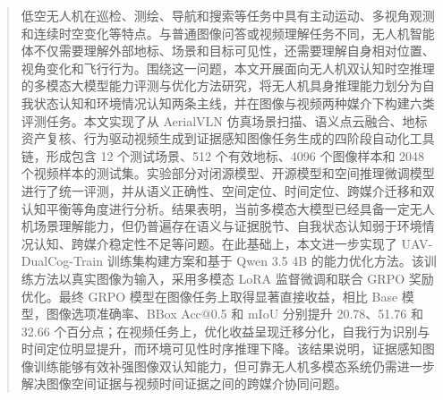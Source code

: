 
\begin{abstract}
    低空无人机在巡检、测绘、导航和搜索等任务中具有主动运动、多视角观测和连续时空变化等特点。与普通图像问答或视频理解任务不同，无人机智能体不仅需要理解外部地标、场景和目标可见性，还需要理解自身相对位置、视角变化和飞行行为。围绕这一问题，本文开展面向无人机双认知时空推理的多模态大模型能力评测与优化方法研究，将无人机具身推理能力划分为自我状态认知和环境情况认知两条主线，并在图像与视频两种媒介下构建六类评测任务。本文实现了从 AerialVLN 仿真场景扫描、语义点云融合、地标资产复核、行为驱动视频生成到证据感知图像任务生成的四阶段自动化工具链，形成包含 12 个测试场景、512 个有效地标、4096 个图像样本和 2048 个视频样本的测试集。实验部分对闭源模型、开源模型和空间推理微调模型进行了统一评测，并从语义正确性、空间定位、时间定位、跨媒介迁移和双认知平衡等角度进行分析。结果表明，当前多模态大模型已经具备一定无人机场景理解能力，但仍普遍存在语义与证据脱节、自我状态认知弱于环境情况认知、跨媒介稳定性不足等问题。在此基础上，本文进一步实现了 UAV-DualCog-Train 训练集构建方案和基于 Qwen 3.5 4B 的能力优化方法。该训练方法以真实图像为输入，采用多模态 LoRA 监督微调和联合 GRPO 奖励优化。最终 GRPO 模型在图像任务上取得显著直接收益，相比 Base 模型，图像选项准确率、BBox Acc@0.5 和 mIoU 分别提升 20.78、51.76 和 32.66 个百分点；在视频任务上，优化收益呈现迁移分化，自我行为识别与时间定位明显提升，而环境可见性时序推理下降。该结果说明，证据感知图像训练能够有效补强图像双认知能力，但可靠无人机多模态系统仍需进一步解决图像空间证据与视频时间证据之间的跨媒介协同问题。
\end{abstract}

